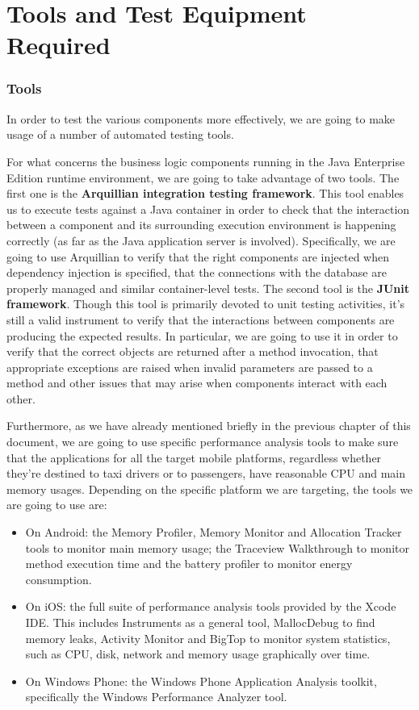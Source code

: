 \chapter{Tools and Test Equipment Required}
\subsection{Tools}
In order to test the various components more effectively, we are going to make usage of a number of automated testing tools. 

For what concerns the business logic components running in the Java Enterprise Edition runtime environment, we are going to take advantage of two tools.
The first one is the \textbf{Arquillian integration testing framework}. This tool enables us to execute tests against a Java container in order to check that the interaction between a component and its surrounding execution environment is happening correctly (as far as the Java application server is involved). Specifically, we are going to use Arquillian to verify that the right components are injected when dependency injection is specified, that the connections with the database are properly managed and similar container-level tests.
The second tool is the \textbf{JUnit framework}. Though this tool is primarily devoted to unit testing activities, it's still a valid instrument to verify that the interactions between components are producing the expected results. In particular, we are going to use it in order to verify that the correct objects are returned after a method invocation, that appropriate exceptions are raised when invalid parameters are passed to a method and other issues that may arise when components interact with each other.

Furthermore, as we have already mentioned briefly in the previous chapter of this document, we are going to use specific performance analysis tools to make sure that the applications for all the target mobile platforms, regardless whether they're destined to taxi drivers or to passengers, have reasonable CPU and main memory usages. Depending on the specific platform we are targeting, the tools we are going to use are:
\begin{itemize}
	\item On Android: the Memory Profiler, Memory Monitor and Allocation Tracker tools to monitor main memory usage; the Traceview Walkthrough to monitor method execution time and the battery profiler to monitor energy consumption.
	\item On iOS: the full suite of performance analysis tools provided by the Xcode IDE. This includes Instruments as a general tool, MallocDebug to find memory leaks, Activity Monitor and BigTop to monitor system statistics, such as CPU, disk, network and memory usage graphically over time.  
	\item On Windows Phone: the Windows Phone Application Analysis toolkit, specifically the Windows Performance Analyzer tool.
\end{itemize}
